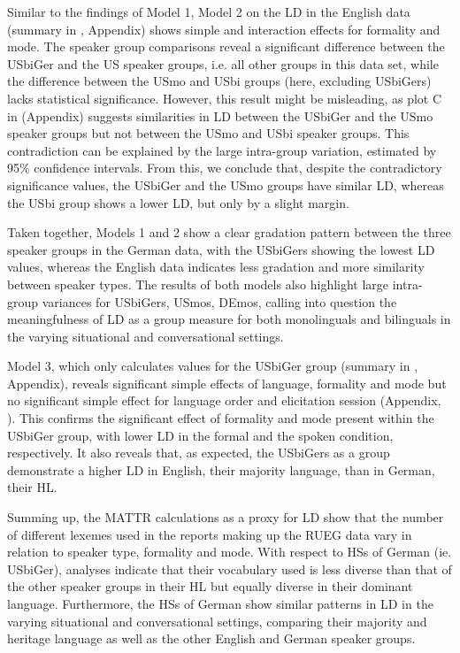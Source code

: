 \documentclass[output=paper,colorlinks,citecolor=brown]{langscibook}
\begin{document}
Similar to the findings of Model 1, Model 2 on the LD in the English data (summary in , Appendix) shows simple and interaction effects for formality and mode. The speaker group comparisons reveal a significant difference between the USbiGer and the US speaker groups, i.e. all other groups in this data set, while the difference between the USmo and USbi groups (here, excluding USbiGers) lacks statistical significance. However, this result might be misleading, as plot C in  (Appendix) suggests similarities in LD between the USbiGer and the USmo speaker groups but not between the USmo and USbi speaker groups. This contradiction can be explained by the large intra-group variation, estimated by 95\% confidence intervals. From this, we conclude that, despite the contradictory significance values, the USbiGer and the USmo groups have similar LD, whereas the USbi group shows a lower LD, but only by a slight margin.

Taken together, Models 1 and 2 show a clear gradation pattern between the three speaker groups in the German data, with the USbiGers showing the lowest LD values, whereas the English data indicates less gradation and more similarity between speaker types. The results of both models also highlight large intra-group variances for USbiGers, USmos, DEmos, calling into question the meaningfulness of LD as a group measure for both monolinguals and bilinguals in the varying situational and conversational settings. 

Model 3, which only calculates values for the USbiGer group (summary in , Appendix), reveals significant simple effects of language, formality and mode but no significant simple effect for language order and elicitation session (Appendix, ). This confirms the significant effect of formality and mode present within the USbiGer group, with lower LD in the formal and the spoken condition, respectively. It also reveals that, as expected, the USbiGers as a group demonstrate a higher LD in English, their majority language, than in German, their HL.

Summing up, the MATTR calculations as a proxy for LD show that the number of different lexemes used in the reports making up the RUEG data vary in relation to speaker type, formality and mode. With respect to HSs of German (ie. USbiGer), analyses indicate that their vocabulary used is less diverse than that of the other speaker groups in their HL but equally diverse in their dominant language. Furthermore, the HSs of German show similar patterns in LD in the varying situational and conversational settings, comparing their majority and heritage language as well as the other English and German speaker groups.
\end{document}
